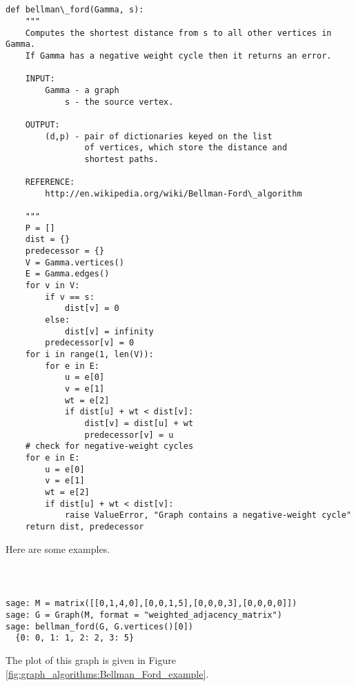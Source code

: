 %
\begin{center}
\fontsize{9pt}{9pt}
\selectfont
\tt
\begin{lstlisting}

def bellman\_ford(Gamma, s):
    """
    Computes the shortest distance from s to all other vertices in Gamma.
    If Gamma has a negative weight cycle then it returns an error.

    INPUT:
        Gamma - a graph 
            s - the source vertex.

    OUTPUT:
        (d,p) - pair of dictionaries keyed on the list 
                of vertices, which store the distance and 
                shortest paths.

    REFERENCE:
        http://en.wikipedia.org/wiki/Bellman-Ford\_algorithm

    """
    P = []
    dist = {}
    predecessor = {}
    V = Gamma.vertices()
    E = Gamma.edges()
    for v in V:
        if v == s:
            dist[v] = 0
        else:
            dist[v] = infinity
        predecessor[v] = 0
    for i in range(1, len(V)):       
        for e in E: 
            u = e[0]
            v = e[1]     
            wt = e[2]     
            if dist[u] + wt < dist[v]:
                dist[v] = dist[u] + wt
                predecessor[v] = u
    # check for negative-weight cycles
    for e in E:
        u = e[0]
        v = e[1]     
        wt = e[2]     
        if dist[u] + wt < dist[v]:
            raise ValueError, "Graph contains a negative-weight cycle"
    return dist, predecessor

\end{lstlisting}
\end{center}

Here are some examples.

%
\begin{center}
\fontsize{9pt}{9pt}
\selectfont
\tt
\begin{lstlisting}

sage: M = matrix([[0,1,4,0],[0,0,1,5],[0,0,0,3],[0,0,0,0]])
sage: G = Graph(M, format = "weighted_adjacency_matrix")
sage: bellman_ford(G, G.vertices()[0])
  {0: 0, 1: 1, 2: 2, 3: 5}

\end{lstlisting}
\end{center}
The plot of this graph is given in Figure
\ref{fig:graph_algorithms:Bellman_Ford_example}.



